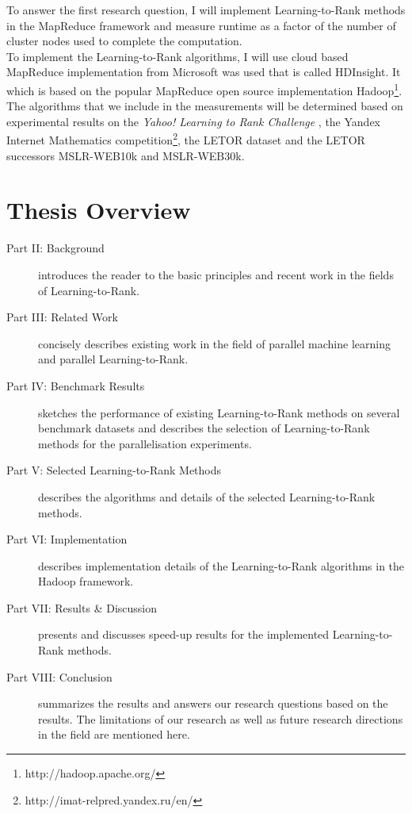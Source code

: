 To answer the first research question, I will implement Learning-to-Rank methods in the MapReduce framework and measure runtime as a factor of the number of cluster nodes used to complete the computation.\\

To implement the Learning-to-Rank algorithms, I will use cloud based MapReduce implementation from Microsoft was used that is called HDInsight. It which is based on the popular MapReduce open source implementation Hadoop\footnote{http://hadoop.apache.org/}.
The algorithms that we include in the measurements will be determined based on experimental results on the \emph{Yahoo! Learning to Rank Challenge} \cite{Chapelle2011a}, the Yandex Internet Mathematics competition\footnote{http://imat-relpred.yandex.ru/en/}, the LETOR \cite{Qin2010} dataset and the LETOR successors MSLR-WEB10k and MSLR-WEB30k.

\chapter{Thesis Overview}

\begin{description}
\item[Part II: Background]{introduces the reader to the basic principles and recent work in the fields of Learning-to-Rank.}
\item[Part III: Related Work]{concisely describes existing work in the field of parallel machine learning and parallel Learning-to-Rank.}
\item[Part IV: Benchmark Results]{sketches the performance of existing Learning-to-Rank methods on several benchmark datasets and describes the selection of Learning-to-Rank methods for the parallelisation experiments.}
\item[Part V: Selected Learning-to-Rank Methods]{describes the algorithms and details of the selected Learning-to-Rank methods.}
\item[Part VI: Implementation]{describes implementation details of the Learning-to-Rank algorithms in the Hadoop framework.}
\item[Part VII: Results \& Discussion]{presents and discusses speed-up results for the implemented Learning-to-Rank methods.}
\item[Part VIII: Conclusion]{summarizes the results and answers our research questions based on the results. The limitations of our research as well as future research directions in the field are mentioned here.}
\end{description}